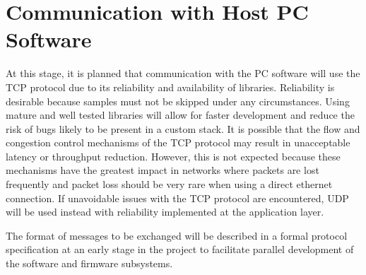 \documentclass[12pt]{report}
\begin{document}
\section{Communication with Host PC Software}
At this stage, it is planned that communication with the PC software will use the TCP protocol due to its reliability and availability of libraries. Reliability is desirable because samples must not be skipped under any circumstances. Using mature and well tested libraries will allow for faster development and reduce the risk of bugs likely to be present in a custom stack. It is possible that the flow and congestion control mechanisms of the TCP protocol may result in unacceptable latency or throughput reduction. However, this is not expected because these mechanisms have the greatest impact in networks where packets are lost frequently\cite{TCPCongestion} and packet loss should be very rare when using a direct ethernet connection. If unavoidable issues with the TCP protocol are encountered, UDP will be used instead with reliability implemented at the application layer.

The format of messages to be exchanged will be described in a formal protocol specification at an early stage in the project to facilitate parallel development of the software and firmware subsystems.
\end{document}
